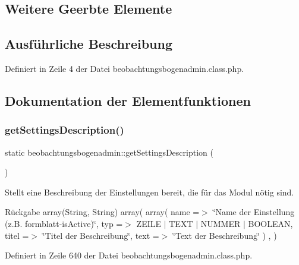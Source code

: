 \subsection*{Weitere Geerbte Elemente}


\subsection{Ausführliche Beschreibung}


Definiert in Zeile 4 der Datei beobachtungsbogenadmin.\+class.\+php.



\subsection{Dokumentation der Elementfunktionen}
\mbox{\label{classbeobachtungsbogenadmin_a3d80383407a6ca289cd852a90e7ccc25}} 
\subsubsection{\texorpdfstring{get\+Settings\+Description()}{getSettingsDescription()}}
{\footnotesize\ttfamily static beobachtungsbogenadmin\+::get\+Settings\+Description (\begin{DoxyParamCaption}{ }\end{DoxyParamCaption})\hspace{0.3cm}{\ttfamily [static]}}

Stellt eine Beschreibung der Einstellungen bereit, die für das Modul nötig sind. \begin{DoxyReturn}{Rückgabe}
array(\+String, String) array( array( \textquotesingle{}name\textquotesingle{} =$>$ \char`\"{}\+Name der Einstellung (z.\+B. formblatt-\/is\+Active)\char`\"{}, \textquotesingle{}typ\textquotesingle{} =$>$ Z\+E\+I\+LE $\vert$ T\+E\+XT $\vert$ N\+U\+M\+M\+ER $\vert$ B\+O\+O\+L\+E\+AN, \textquotesingle{}titel\textquotesingle{} =$>$ \char`\"{}\+Titel der Beschreibung\char`\"{}, \textquotesingle{}text\textquotesingle{} =$>$ \char`\"{}\+Text der Beschreibung\char`\"{} ) , ) 
\end{DoxyReturn}


Definiert in Zeile 640 der Datei beobachtungsbogenadmin.\+class.\+php.

